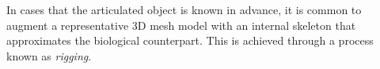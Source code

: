 
\begin{definition}
    
In cases that the articulated object is known in advance, it is common to augment a representative 3D mesh model with an internal skeleton that approximates the biological counterpart. This is achieved through a process known as \emph{rigging}.  



\end{definition}
